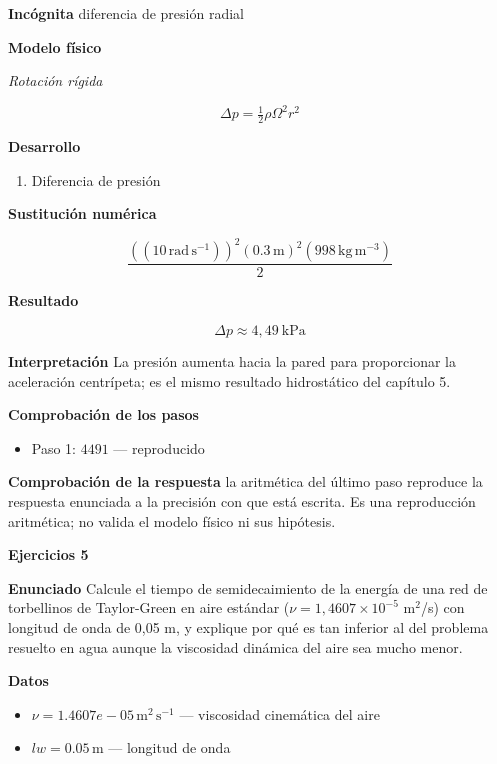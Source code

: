 \documentclass[10pt,openany]{book}
\begin{document}
\noindent\textbf{Incógnita}
diferencia de presión radial

\noindent\textbf{Modelo físico}

\noindent\textit{Rotación rígida}

\[
\Delta p = \tfrac12\rho\Omega^{2}r^{2}
\]

\noindent\textbf{Desarrollo}
\begin{enumerate}
\item
Diferencia de presión
\end{enumerate}

\noindent\textbf{Sustitución numérica}

\[
\frac{\left(\left(10\,\mathrm{rad}\,\mathrm{s}^{-1}\right)\right)^{2} \left(0.3\,\mathrm{m}\right)^{2} \left(998\,\mathrm{kg}\,\mathrm{m}^{-3}\right)}{2}
\]

\noindent\textbf{Resultado}

\[
\Delta p \approx 4{,}49\ \mathrm{kPa}
\]

\noindent\textbf{Interpretación}
La presión aumenta hacia la pared para proporcionar la aceleración centrípeta; es el mismo resultado hidrostático del capítulo 5.

\noindent\textbf{Comprobación de los pasos}
\begin{itemize}
\item Paso 1: $4491$ — reproducido
\end{itemize}

\noindent\textbf{Comprobación de la respuesta} la aritmética del último paso reproduce la respuesta enunciada a la precisión con que está escrita. Es una reproducción aritmética; no valida el modelo físico ni sus hipótesis.

\noindent\textbf{Ejercicios 5}

\noindent\textbf{Enunciado}
Calcule el tiempo de semidecaimiento de la energía de una red de torbellinos de Taylor-Green en aire estándar (\(\nu = 1{,}4607\times 10^{-5}\) m\(^2\)/s) con longitud de onda de 0,05 m, y explique por qué es tan inferior al del problema resuelto en agua aunque la viscosidad dinámica del aire sea mucho menor.

\noindent\textbf{Datos}
\begin{itemize}
\item $\nu = 1.4607e-05\,\mathrm{m}^{2}\,\mathrm{s}^{-1}$ — viscosidad cinemática del aire
\item $lw = 0.05\,\mathrm{m}$ — longitud de onda
\end{itemize}
\end{document}
